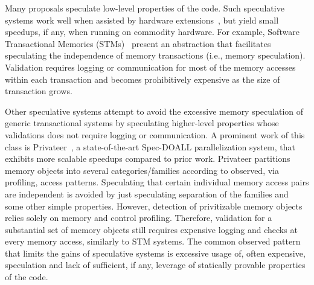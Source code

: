 Many proposals speculate low-level properties of the code.
%
Such speculative systems work well when assisted by hardware
extensions~\cite{TLS papers...}, but yield small speedups, if any, when running
on commodity hardware.
For example, Software Transactional Memories (STMs)~\cite{stmlite, ..} present
an abstraction that facilitates speculating the independence of memory
transactions (i.e., memory speculation). Validation requires logging or
communication for most of the memory accesses within each transaction and
becomes prohibitively expensive as the size of transaction grows.
%

Other speculative systems attempt to avoid the excessive memory speculation of
generic transactional systems by speculating higher-level properties whose
validations does not require logging or communication.
%
A prominent work of this class is Privateer~\cite{johnson:12:pldi:short}, a
state-of-the-art Spec-DOALL parallelization system, that exhibits more scalable
speedups compared to prior work.
%
Privateer partitions memory objects into several categories/families according
to observed, via profiling, access patterns.  Speculating that certain
individual memory access pairs are independent is avoided by just speculating
separation of the families and some other simple properties.  However, detection
of privitizable memory objects relies solely on memory and control profiling.
Therefore, validation for a substantial set of memory objects still requires
expensive logging and checks at every memory access, similarly to STM systems.
%
The common observed pattern that limits the gains of speculative systems is
excessive usage of, often expensive, speculation and lack of sufficient, if any,
leverage of statically provable properties of the code.

